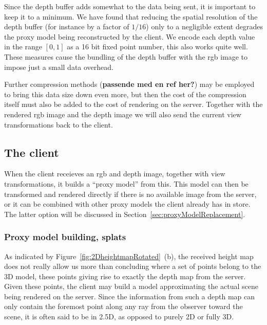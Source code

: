 Since the depth buffer adds somewhat to the data being sent, it is important to
keep it to a minimum. We have found that reducing the spatial resolution of the
depth buffer (for instance by a factor of $1/16$) only to a negligible extent
degrades the proxy model being reconstructed by the client. We encode each depth
value in the range $[0, 1]$ as a 16 bit fixed point number, this also works
quite well. These measures cause the bundling of the depth buffer with the rgb
image to impose just a small data overhead.

Further compression methods (\textbf{passende med en ref her?}) may be employed
to bring this data size down even more, but then the cost of the compression
itself must also be added to the cost of rendering on the server.
%
%
Together with the rendered rgb image and the depth image we will also send the
current view transformations back to the client.


\subsection{The client}
\label{sec:client}

When the client receieves an rgb and depth image, together with view
transformations, it builds a ``proxy model'' from this. This model can then be
transformed and rendered directly if there is no available image from the
server, or it can be combined with other proxy models the client already has in
store. The latter option will be discussed in
Section~\ref{sec:proxyModelReplacement}.


\subsubsection{Proxy model building, splats}

As indicated by Figure~\ref{fig:2DheightmapRotated}~(b), the received
height map does not really allow us more than concluding where a set of points
belong to the 3D model, these points giving rise to exactly the depth map from
the server. Given these points, the client may build a model approximating the
actual scene being rendered on the server. Since the information from such a
depth map can only contain the foremost point along any ray from the observer
toward the scene, it is often said to be in 2.5D, as opposed to purely 2D or
fully 3D.

